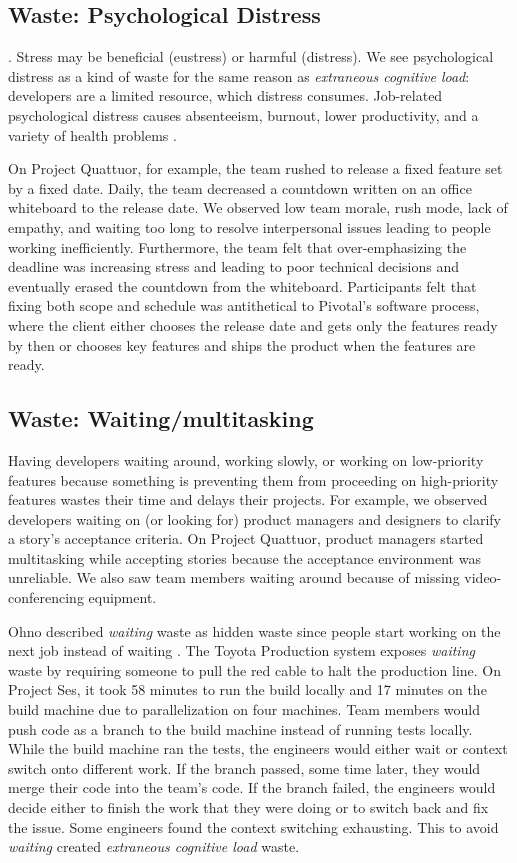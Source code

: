 \subsection{Waste: Psychological Distress}
 \cite{Selye1976}. Stress may be beneficial (eustress) or harmful (distress). We see psychological distress as a kind of waste for the same reason as \textit{extraneous cognitive load}: developers are a limited resource, which distress consumes. Job-related psychological distress causes absenteeism, burnout, lower productivity, and a variety of health problems \cite{Westman2001}.   
 
On Project Quattuor, for example, the team rushed to release a fixed feature set by a fixed date. Daily, the team decreased a countdown written on an office whiteboard to the release date. We observed low team morale, rush mode, lack of empathy, and waiting too long to resolve interpersonal issues leading to people working inefficiently. Furthermore, the team felt that over-emphasizing the deadline was increasing stress and leading to poor technical decisions and eventually erased the countdown from the whiteboard. Participants felt that fixing both scope and schedule was antithetical to Pivotal's software process, where the client either chooses the release date and gets only the features ready by then or chooses key features and ships the product when the features are ready. 

\subsection{Waste: Waiting/multitasking}
Having developers waiting around, working slowly, or working on low-priority features because something is preventing them from proceeding on high-priority features wastes their time and delays their projects. For example, we observed developers waiting on (or looking for) product managers and designers to clarify a story's acceptance criteria. On Project Quattuor, product managers started multitasking while accepting stories because the acceptance environment was unreliable. We also saw team members waiting around because of missing video-conferencing equipment. 

Ohno described \textit{waiting} waste as hidden waste since people start working on the next job instead of waiting \cite{OhnoToyotaProductionSystem}. The Toyota Production system exposes \textit{waiting} waste by requiring someone to pull the red cable to halt the production line. On Project Ses, it took 58 minutes to run the build locally and 17 minutes on the build machine due to parallelization on four machines. Team members would push code as a branch to the build machine instead of running tests locally. While the build machine ran the tests, the engineers would either wait or context switch onto different work. If the branch passed, some time later, they would merge their code into the team's code. If the branch failed, the engineers would decide either to finish the work that they were doing or to switch back and fix the issue. Some engineers found the context switching exhausting. This  to avoid \textit{waiting} created \textit{extraneous cognitive load} waste.

